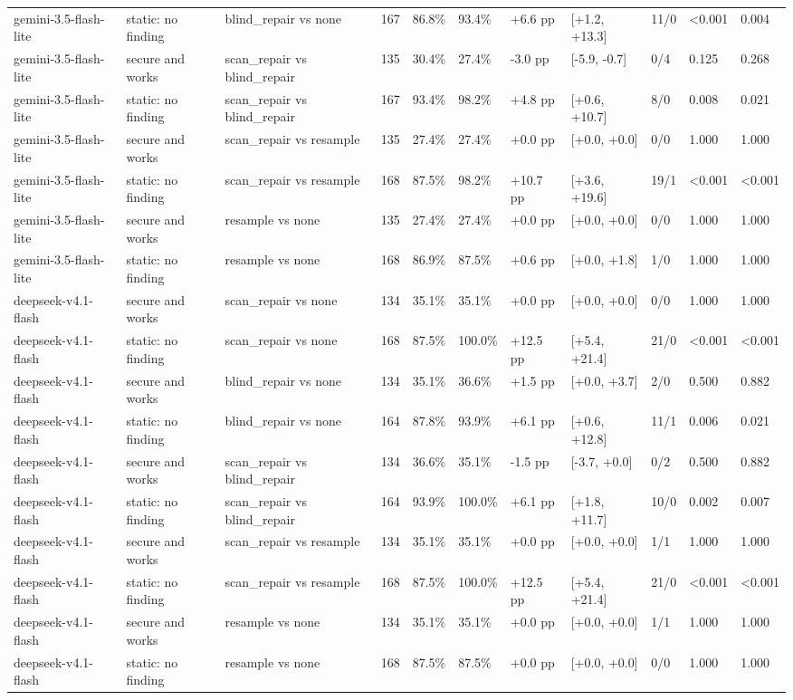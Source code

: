 \begin{table}[t]
\begin{tabular}{lllllllllll}
gemini-3.5-flash-lite & static: no finding & blind\_repair vs none & 167 & 86.8\% & 93.4\% & +6.6 pp & [+1.2, +13.3] & 11/0 & <0.001 & 0.004 \\
gemini-3.5-flash-lite & secure and works & scan\_repair vs blind\_repair & 135 & 30.4\% & 27.4\% & -3.0 pp & [-5.9, -0.7] & 0/4 & 0.125 & 0.268 \\
gemini-3.5-flash-lite & static: no finding & scan\_repair vs blind\_repair & 167 & 93.4\% & 98.2\% & +4.8 pp & [+0.6, +10.7] & 8/0 & 0.008 & 0.021 \\
gemini-3.5-flash-lite & secure and works & scan\_repair vs resample & 135 & 27.4\% & 27.4\% & +0.0 pp & [+0.0, +0.0] & 0/0 & 1.000 & 1.000 \\
gemini-3.5-flash-lite & static: no finding & scan\_repair vs resample & 168 & 87.5\% & 98.2\% & +10.7 pp & [+3.6, +19.6] & 19/1 & <0.001 & <0.001 \\
gemini-3.5-flash-lite & secure and works & resample vs none & 135 & 27.4\% & 27.4\% & +0.0 pp & [+0.0, +0.0] & 0/0 & 1.000 & 1.000 \\
gemini-3.5-flash-lite & static: no finding & resample vs none & 168 & 86.9\% & 87.5\% & +0.6 pp & [+0.0, +1.8] & 1/0 & 1.000 & 1.000 \\
deepseek-v4.1-flash & secure and works & scan\_repair vs none & 134 & 35.1\% & 35.1\% & +0.0 pp & [+0.0, +0.0] & 0/0 & 1.000 & 1.000 \\
deepseek-v4.1-flash & static: no finding & scan\_repair vs none & 168 & 87.5\% & 100.0\% & +12.5 pp & [+5.4, +21.4] & 21/0 & <0.001 & <0.001 \\
deepseek-v4.1-flash & secure and works & blind\_repair vs none & 134 & 35.1\% & 36.6\% & +1.5 pp & [+0.0, +3.7] & 2/0 & 0.500 & 0.882 \\
deepseek-v4.1-flash & static: no finding & blind\_repair vs none & 164 & 87.8\% & 93.9\% & +6.1 pp & [+0.6, +12.8] & 11/1 & 0.006 & 0.021 \\
deepseek-v4.1-flash & secure and works & scan\_repair vs blind\_repair & 134 & 36.6\% & 35.1\% & -1.5 pp & [-3.7, +0.0] & 0/2 & 0.500 & 0.882 \\
deepseek-v4.1-flash & static: no finding & scan\_repair vs blind\_repair & 164 & 93.9\% & 100.0\% & +6.1 pp & [+1.8, +11.7] & 10/0 & 0.002 & 0.007 \\
deepseek-v4.1-flash & secure and works & scan\_repair vs resample & 134 & 35.1\% & 35.1\% & +0.0 pp & [+0.0, +0.0] & 1/1 & 1.000 & 1.000 \\
deepseek-v4.1-flash & static: no finding & scan\_repair vs resample & 168 & 87.5\% & 100.0\% & +12.5 pp & [+5.4, +21.4] & 21/0 & <0.001 & <0.001 \\
deepseek-v4.1-flash & secure and works & resample vs none & 134 & 35.1\% & 35.1\% & +0.0 pp & [+0.0, +0.0] & 1/1 & 1.000 & 1.000 \\
deepseek-v4.1-flash & static: no finding & resample vs none & 168 & 87.5\% & 87.5\% & +0.0 pp & [+0.0, +0.0] & 0/0 & 1.000 & 1.000 \\
\bottomrule
\end{tabular}
\end{table}
